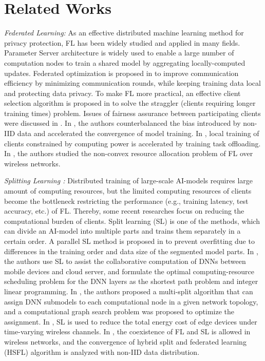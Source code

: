 \documentclass[10pt,journal,transmag]{IEEEtran}
\begin{document}
\section{Related Works}
\textit{Federated Learning:}
As an effective distributed machine learning method for privacy protection, FL has been widely studied and applied in many fields.
Parameter Server architecture \cite{10.5555/2999134.2999271} is widely used to enable a large number of computation nodes to train a shared model by aggregating locally-computed updates.
Federated optimization  \cite{DBLP:journals/corr/KonecnyMRR16} is proposed in to improve communication efficiency by minimizing communication rounds, while keeping training data local and protecting data privacy.
To make FL more practical, an effective client selection algorithm is proposed in \cite{8761315} to solve the straggler (clients requiring longer training times) problem. Issues of fairness assurance between participating clients were discussed in \cite{9272649}. In \cite{9155494}, the authors counterbalanced the bias introduced by non-IID data and accelerated the convergence of model training. In \cite{WOS:000871080800013}, local training of clients constrained by computing power is accelerated by training task offloading. In \cite{9261995}, the authors studied the non-convex resource allocation problem of FL over wireless networks.

\textit{Splitting Learning :}
Distributed training of large-scale AI-models requires large amount of computing resources, but the limited computing resources of clients become the bottleneck restricting the performance (e.g., training latency, test accuracy, etc.) of FL.
Thereby, some recent researches focus on reducing the computational burden of clients. Split learning (SL) \cite{DBLP:journals/corr/abs-1812-00564} is one of the methods, which can divide an AI-model into multiple parts and trains them separately in a certain order.
A parallel SL method is proposed in \cite{9016486} to prevent overfitting due to differences in the training order and data size of the segmented model parts.
In \cite{8871124}, the authors use SL to assist the collaborative computation of DNNs between mobile devices and cloud server, and formulate the optimal computing-resource scheduling problem for the DNN layers as the shortest path problem and integer linear programming.
In \cite{9814499}, the authors proposed a multi-split algorithm that can assign DNN submodels to each computational node in a given network topology, and a computational graph search problem was proposed to optimize the assignment.
In \cite{9569707}, SL is used to reduce the total energy cost of edge devices under time-varying wireless channels.
In \cite{9923620}, the coexistence of FL and SL is allowed in wireless networks, and the convergence of hybrid split and federated learning (HSFL) algorithm is analyzed with non-IID data distribution.
\end{document}
